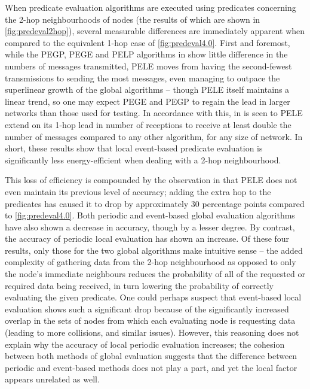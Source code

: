 When predicate evaluation algorithms are executed using predicates concerning the 2-hop neighbourhoods of nodes (the results of which are shown in \autoref{fig:predeval2hop}), several measurable differences are immediately apparent when compared to the equivalent 1-hop case of \autoref{fig:predeval4.0}. First and foremost, while the PEGP, PEGE and PELP algorithms in  show little difference in the numbers of messages transmitted, PELE moves from having the second-fewest transmissions to sending the most messages, even managing to outpace the superlinear growth of the global algorithms -- though PELE itself maintains a linear trend, so one may expect PEGE and PEGP to regain the lead in larger networks than those used for testing. In accordance with this, in  is seen to PELE extend on its 1-hop lead in number of receptions to receive at least double the number of messages compared to any other algorithm, for any size of network. In short, these results show that local event-based predicate evaluation is significantly less energy-efficient when dealing with a 2-hop neighbourhood.

This loss of efficiency is compounded by the observation in  that PELE does not even maintain its previous level of accuracy; adding the extra hop to the predicates has caused it to drop by approximately 30 percentage points compared to \autoref{fig:predeval4.0}. Both periodic and event-based global evaluation algorithms have also shown a decrease in accuracy, though by a lesser degree. By contrast, the accuracy of periodic local evaluation has shown an increase. Of these four results, only those for the two global algorithms make intuitive sense -- the added complexity of gathering data from the 2-hop neighbourhood as opposed to only the node's immediate neighbours reduces the probability of all of the requested or required data being received, in turn lowering the probability of correctly evaluating the given predicate. One could perhaps suspect that event-based local evaluation shows such a significant drop because of the significantly increased overlap in the sets of nodes from which each evaluating node is requesting data (leading to more collisions, and similar issues). However, this reasoning does not explain why the accuracy of local periodic evaluation increases; the cohesion between both methods of global evaluation suggests that the difference between periodic and event-based methods does not play a part, and yet the local factor appears unrelated as well.

